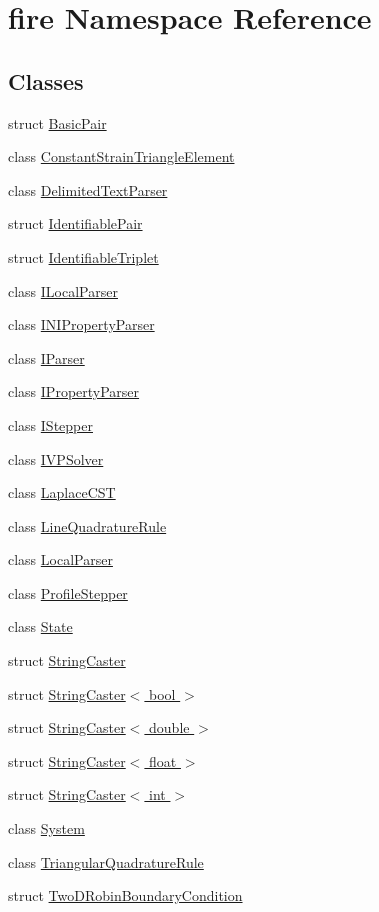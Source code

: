\hypertarget{a00210}{}\section{fire Namespace Reference}
\label{a00210}
\subsection*{Classes}
\begin{DoxyCompactItemize}
\item 
struct \hyperlink{a00793}{Basic\+Pair}
\item 
class \hyperlink{a00789}{Constant\+Strain\+Triangle\+Element}
\item 
class \hyperlink{a00829}{Delimited\+Text\+Parser}
\item 
struct \hyperlink{a00797}{Identifiable\+Pair}
\item 
struct \hyperlink{a00801}{Identifiable\+Triplet}
\item 
class \hyperlink{a00833}{I\+Local\+Parser}
\item 
class \hyperlink{a00837}{I\+N\+I\+Property\+Parser}
\item 
class \hyperlink{a00841}{I\+Parser}
\item 
class \hyperlink{a00845}{I\+Property\+Parser}
\item 
class \hyperlink{a00817}{I\+Stepper}
\item 
class \hyperlink{a00893}{I\+V\+P\+Solver}
\item 
class \hyperlink{a00809}{Laplace\+C\+ST}
\item 
class \hyperlink{a00885}{Line\+Quadrature\+Rule}
\item 
class \hyperlink{a00849}{Local\+Parser}
\item 
class \hyperlink{a00821}{Profile\+Stepper}
\item 
class \hyperlink{a00897}{State}
\item 
struct \hyperlink{a00853}{String\+Caster}
\item 
struct \hyperlink{a00869}{String\+Caster$<$ bool $>$}
\item 
struct \hyperlink{a00857}{String\+Caster$<$ double $>$}
\item 
struct \hyperlink{a00861}{String\+Caster$<$ float $>$}
\item 
struct \hyperlink{a00865}{String\+Caster$<$ int $>$}
\item 
class \hyperlink{a00825}{System}
\item 
class \hyperlink{a00889}{Triangular\+Quadrature\+Rule}
\item 
struct \hyperlink{a00805}{Two\+D\+Robin\+Boundary\+Condition}
\end{DoxyCompactItemize}
